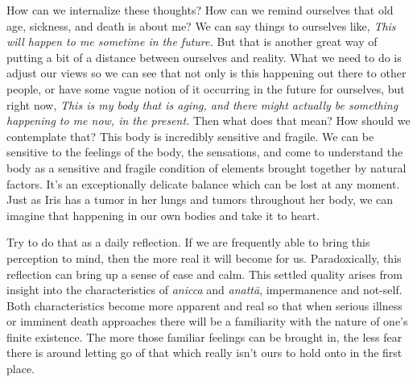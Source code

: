 How can we internalize these thoughts? How can we remind ourselves that 
old age, sickness, and death is about me? We can say things to 
ourselves like, \emph{This will happen to me sometime in the future.} 
But that is another great way of putting a bit of a distance between 
ourselves and reality. What we need to do is adjust our views so we can 
see that not only is this happening out there to other people, or have 
some vague notion of it occurring in the future for ourselves, but 
right now, \emph{This is my body that is aging, and there might 
actually be something happening to me now, in the present.} Then what 
does that mean? How should we contemplate that? This body is incredibly 
sensitive and fragile. We can be sensitive to the feelings of the body, 
the sensations, and come to understand the body as a sensitive and 
fragile condition of elements brought together by natural factors. It's 
an exceptionally delicate balance which can be lost at any moment. Just 
as Iris has a tumor in her lungs and tumors throughout her body, we can 
imagine that happening in our own bodies and take it to heart.

Try to do that as a daily reflection. If we are frequently able to 
bring this perception to mind, then the more real it will become for 
us. Paradoxically, this reflection can bring up a sense of ease and 
calm. This settled quality arises from insight into the characteristics 
of \emph{anicca} and \emph{anattā}, impermanence and not-self. Both 
characteristics become more apparent and real so that when serious 
illness or imminent death approaches there will be a familiarity with 
the nature of one's finite existence. The more those familiar feelings 
can be brought in, the less fear there is around letting go of that 
which really isn't ours to hold onto in the first place.


